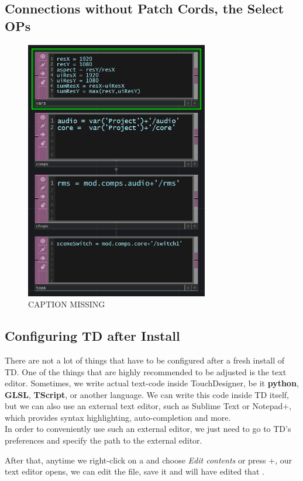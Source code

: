 \subsection{Connections without Patch Cords, the Select OPs}

\begin{figure}[H]
	\centering
	\includegraphics[width=8cm]{img/localModules.PNG}
	\caption[shortCaption]
	{CAPTION MISSING}
	\label{fig:label}
\end{figure}




\subsection{Configuring TD after Install} %
\label{sub:config}
There are not a lot of things that have to be configured after a fresh install of TD. One of the things that are highly recommended to be adjusted is the text editor. Sometimes, we write actual text-code inside TouchDesigner, be it \textbf{python}, \textbf{GLSL}, \textbf{TScript}, or another language. We can write this code inside TD itself, but we can also use an external text editor, such as Sublime Text or Notepad+, which provides syntax highlighting, auto-completion and more.\\
In order to conveniently use such an external editor, we just need to go to TD's preferences and specify the path to the external editor.

After that, anytime we right-click on a \DAT and choose \textit{Edit contents} or press +, our text editor opens, we can edit the file, save it and will have edited that \DAT.



